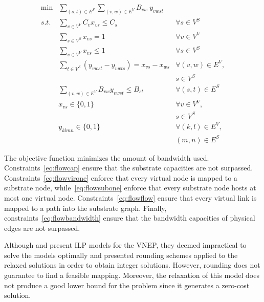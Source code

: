 \documentclass[conference]{IEEEtran}
\begin{document}
\begin{align}
     \min & \sum\limits_{(s,t) \in E^{S}} \sum\limits_{(v,w) \in E^{V}} B_{vw}~ y_{vwst} & \nonumber \\
    s.t. & \sum\limits_{v \in V^{V}} C_{v} x_{vs} \leq C_{s}                                   & \forall s \in V^{S}  \label{eq:flowcap} \\
         & \sum\limits_{s \in V^{S}} x_{vs} = 1                                                & \forall v \in V^{V}  \label{eq:flowvirone}\\
         & \sum\limits_{v \in V^{V}} x_{vs} \leq 1                                             & \forall s \in V^{S} \label{eq:flowsubone} \\
         & \sum\limits_{t \in V^{S}} ( y_{vwst} - y_{vwts}) = x_{vs} - x_{ws} & \forall (v,w) \in E^{V}, \nonumber \\ 
         &                                                                    & s \in V^{S} \label{eq:flowflow} \\
         & \sum\limits_{(v,w) \in E^{V}} B_{vw}  y_{vwst} \leq B_{st}                 & \forall (s,t) \in E^{S} \label{eq:flowbandwidth} \\
         & x_{vs} \in \{0,1\}                                                                  & \forall v \in V^{V}, \nonumber \\
         &                                                                                      & s \in V^{S} \\
         & y_{klmn} \in \{0,1\}                                                         & \forall (k,l) \in E^{V}, \nonumber \\
         &                                                                                 & (m,n) \in E^{S}
\end{align} 

The objective function minimizes the amount of bandwidth used. 
Constraints~\eqref{eq:flowcap} ensure that the substrate capacities are not surpassed. 
Constraints~\eqref{eq:flowvirone} enforce that every virtual node is mapped to a substrate node, while~\eqref{eq:flowsubone} enforce that every substrate node hosts at most one virtual node. 
Constraints~\eqref{eq:flowflow}
ensure that every virtual link is mapped to a path into the substrate graph. Finally, constraints~\eqref{eq:flowbandwidth} ensure that the bandwidth capacities of physical edges are not surpassed.

Although \cite{Chowdhury:2012} and \cite{Alkmim2013} present ILP models for the VNEP, they deemed impractical to solve the models optimally and presented rounding schemes applied to the relaxed solutions in order to obtain integer solutions.
However, rounding does not guarantee to find a feasible mapping.
Moreover, the relaxation of this model does not produce a good lower bound for the problem since it generates a zero-cost solution.
\end{document}
